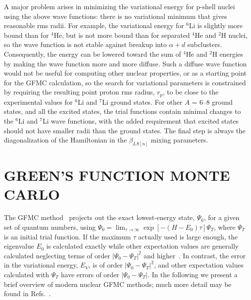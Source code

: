 A major problem arises in minimizing the variational energy for p-shell
nuclei using the above wave functions: there is no variational minimum that
gives reasonable rms radii.
For example, the variational energy for $^6$Li is slightly more bound
than for $^4$He, but is not more bound than for separated $^4$He and $^2$H
nuclei, so the wave function is not stable against breakup into $\alpha + d$
subclusters.
Consequently, the energy can be lowered toward the sum of $^4$He and $^2$H
energies by making the wave function more and more diffuse.
Such a diffuse wave function would not be useful for computing other nuclear
properties, or as a starting point for the GFMC calculation,
so the search for variational parameters is constrained by requiring the
resulting point proton rms radius, $r_p$, to be close to the experimental
values for $^6$Li and $^7$Li ground states.
For other $A$ = 6--8 ground states, and all the excited states,
the trial functions contain minimal changes to the $^6$Li and $^7$Li wave
functions, with the added requirement that excited states should not have
smaller radii than the ground states.
The final step is always the diagonalization of the Hamiltonian in the
$\beta_{LS[n]}$ mixing parameters.

\section{GREEN'S FUNCTION MONTE CARLO}

The GFMC method~\cite{C87,C88} projects out the exact lowest-energy state,
$\Psi_{0}$, for a given set of quantum numbers, using
$\Psi_0 = \lim_{\tau \rightarrow \infty} \exp [ - ( H - E_0) \tau ] \Psi_T$,
where $\Psi_{T}$ is an initial trial function.
If the maximum $\tau$ actually used is large enough,
the eigenvalue $E_{0}$ is calculated exactly while other expectation values
are generally calculated neglecting terms of order $|\Psi_{0}-\Psi_{T}|^{2}$
and higher~\cite{PPCPW97}.
In contrast, the error in the variational energy, $E_{V}$, is of order
$|\Psi_{0}-\Psi_{T}|^{2}$, and other expectation values calculated with
$\Psi_{T}$ have errors of order $|\Psi_{0}-\Psi_{T}|$.
In the following we present a brief overview of modern nuclear GFMC
methods; much more detail may be found in Refs.~\cite{PPCPW97,WPCP00}.

